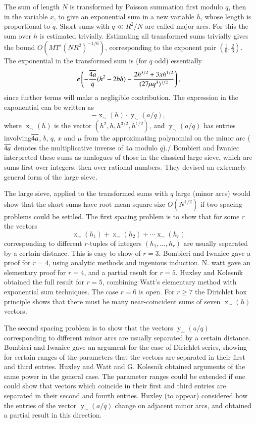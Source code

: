 The sum of length $N$ is transformed by Poisson summation first modulo
$q$, then in the variable $x$, to give an exponential sum in a new
variable $h$, whose length is proportional to $q$. Short sums with $q
\ll R^2/N$ are called major arcs. For this the sum over $h$ is
estimated trivially. Estimating all transformed sums trivially gives
the bound 
{\small $O(MT^\epsilon (NR^2)^{- 1/6})$},
corresponding to the
exponent pair $\left(\frac{1}{6}, \frac{2}{3} \right)$. The
exponential in the transformed sum is (for $q$ odd) essentially
$$
e\left(- \frac{\overline{4a}}{q} (h^2 - 2 bh) - \frac{2 h^{3/2}+ 3 x
  h^{1/2}}{(27 \mu q^3)^{1/2}} \right),
$$
since further terms will make a negligible contribution. The
expression in the exponential can be written as
$$
- \mathop{x}_\sim (h) \cdot \mathop{y}_\sim (a/q),
$$
where $\displaystyle{\mathop{x}_\sim(h)}$ is the vector $(h^2 , h, h^{3/2},
h^{1/2})$, and $\displaystyle{\mathop{y}_\sim(a/q)}$ has entries
involving\pageoriginale $\overline{4a}$, $b$, $q$, $x$ and $\mu$ from the
approximating polynomial on the minor arc ($\overline{4a}$ denotes the
multiplicative inverse of $4a$ modulo $q$)./ Bombieri and Iwaniec
interpreted these sums as analogues of those in the classical large
sieve, which are sums first over integers, then over rational
numbers. They devised an extremely general form of the large sieve.

The large sieve, applied to the transformed sums with $q$ large (minor
arcs) would show that the short sums have root mean square size
$O(N^{1/2})$ if two spacing problems could be settled. The first
spacing problem is to show that for some $r$ the vectors
$$
\mathop{x}_\sim(h_1)+ \mathop{x}_\sim(h_2)+ \cdots \mathop{x}_\sim(h_r)
$$
corresponding to different $r$-tuples of integers $(h_1 , \ldots ,
h_r)$ are usually separated by a certain distance. This is easy to
show of $r=3$. Bombieri and Iwaniec \cite{Bombieri and Iwaniec1} gave a proof  for $r=4$,
using analytic methods and ingenious induction. N. watt gave an
elementary proof for $r=4$, and a partial result for $r=5$. Huxley and
Kolesnik \cite{Huxley and Kolesnik1} obtained the full result for $r=5$, combining Watt's
elementary method with exponential sum techniques. The case $r=6$ is
open. For $r \geq 7$ the Dirichlet box principle shows that there must
be many near-coincident sums of seven
$\displaystyle{\mathop{x}_\sim(h)}$ vectors.

The second spacing problem is to show that the vectors
$\displaystyle{\mathop{y}_\sim}(a/q)$ corresponding to different minor
arcs are usually separated by a certain distance. Bombieri and Iwaniec
\cite{Bombieri and Iwaniec1} gave an argument for the case of Dirichlet series, showing
for certain ranges of the parameters that the vectors are separated in
their first and third entries. Huxley and Watt \cite{Huxley and Watt1} and
G. Kolesnik obtained arguments of the same power in the general
case. The parameter ranges could be extended if one could show that
vectors which coincide in their first and third entries are separated
in their second and fourth entries. Huxley (to appear) considered how
the entries of the vector $\displaystyle{\mathop{y}_\sim(a/q)}$ change
on adjacent minor arcs, and obtained a partial result in this
direction. 

